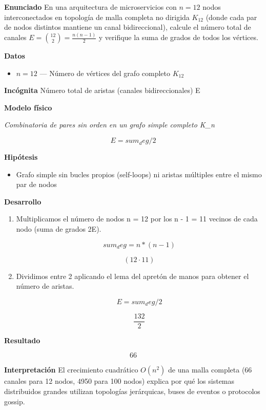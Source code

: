\documentclass{book}
\begin{document}
\begin{tcolorbox}[title={Problema resuelto}, studiumworked, breakable]

\noindent\textbf{Enunciado}
En una arquitectura de microservicios con \(n = 12\) nodos interconectados en topología de malla completa no dirigida \(K_{12}\) (donde cada par de nodos distintos mantiene un canal bidireccional), calcule el número total de canales \(E = \binom{12}{2} = \frac{n(n-1)}{2}\) y verifique la suma de grados de todos los vértices.

\noindent\textbf{Datos}
\begin{itemize}
\item $n = 12$ — Número de vértices del grafo completo \(K_12\)
\end{itemize}

\noindent\textbf{Incógnita}
Número total de aristas (canales bidireccionales) E

\noindent\textbf{Modelo físico}

\noindent\textit{Combinatoria de pares sin orden en un grafo simple completo K\_n}

\[
E = sum_deg / 2
\]

\noindent\textbf{Hipótesis}
\begin{itemize}
\item Grafo simple sin bucles propios (self-loops) ni aristas múltiples entre el mismo par de nodos
\end{itemize}

\noindent\textbf{Desarrollo}
\begin{enumerate}
\item
Multiplicamos el número de nodos n = 12 por los n - 1 = 11 vecinos de cada nodo (suma de grados 2E).

\[
sum_deg = n * (n - 1)
\]

\[
\left(12\cdot 11\right)
\]
\item
Dividimos entre 2 aplicando el lema del apretón de manos para obtener el número de aristas.

\[
E = sum_deg / 2
\]

\[
\frac{132}{2}
\]
\end{enumerate}

\noindent\textbf{Resultado}

\[
66
\]

\noindent\textbf{Interpretación}
El crecimiento cuadrático \(O(n^2)\) de una malla completa (66 canales para 12 nodos, 4950 para 100 nodos) explica por qué los sistemas distribuidos grandes utilizan topologías jerárquicas, buses de eventos o protocolos gossip.


\end{tcolorbox}
\end{document}
